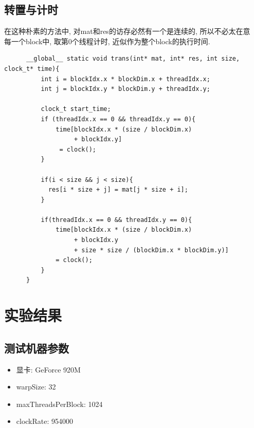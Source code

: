 \documentclass{article}
\begin{document}
  \subsection{转置与计时}
    在这种朴素的方法中, 对mat和res的访存必然有一个是连续的, 所以不必太在意 \\
    每一个block中, 取第0个线程计时, 近似作为整个block的执行时间.
    \lstset{language=C++}
    \begin{lstlisting}
      __global__ static void trans(int* mat, int* res, int size, clock_t* time){
          int i = blockIdx.x * blockDim.x + threadIdx.x;
          int j = blockIdx.y * blockDim.y + threadIdx.y;

          clock_t start_time;
          if (threadIdx.x == 0 && threadIdx.y == 0){
              time[blockIdx.x * (size / blockDim.x)
                   + blockIdx.y]
               = clock();
          }

          if(i < size && j < size){
            res[i * size + j] = mat[j * size + i];
          }

          if(threadIdx.x == 0 && threadIdx.y == 0){
              time[blockIdx.x * (size / blockDim.x)
                   + blockIdx.y
                   + size * size / (blockDim.x * blockDim.y)]
              = clock();
          }
      }
    \end{lstlisting}


\section{实验结果}
  \subsection{测试机器参数}
    \begin{itemize}
      \item 显卡: GeForce 920M
      \item warpSize: 32
      \item maxThreadsPerBlock: 1024
      \item clockRate: 954000
    \end{itemize}
\end{document}
